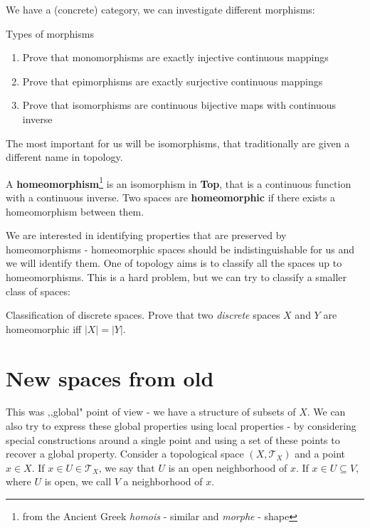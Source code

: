 We have a (concrete) category, we can investigate different morphisms:

\begin{exercise}
  Types of morphisms
  \begin{enumerate}
    \item Prove that monomorphisms are exactly injective continuous mappings
    \item Prove that epimorphisms are exactly surjective continuous mappings
    \item Prove that isomorphisms are continuous bijective maps with continuous inverse
  \end{enumerate}
\end{exercise}

The most important for us will be isomorphisms, that traditionally are given a different name in topology.

\begin{definition}
  A \textbf{homeomorphism}\footnote{from the Ancient Greek \textit{homois} - similar and \textit{morphe} - shape} is an isomorphism in \textbf{Top}, that is a continuous function with a continuous inverse. Two spaces are \textbf{homeomorphic} if there exists a homeomorphism between them.
\end{definition}

We are interested in identifying properties that are preserved by homeomorphisms - homeomorphic spaces should be indistinguishable for us and we will identify them. One of topology aims is to classify all the spaces up to homeomorphisms. This is a hard problem, but we can try to classify a smaller class of spaces:

\begin{exercise}
  Classification of discrete spaces.
  Prove that two \textit{discrete} spaces $X$ and $Y$ are homeomorphic iff $|X|=|Y|.$
\end{exercise}

\section{New spaces from old}




This was ,,global" point of view - we have a structure of subsets of $X$. We can also try to express these global properties using local
properties - by considering special constructions around a single point and using a set of these points to recover a global property.
Consider a topological space $(X,\mathcal T_X)$ and a point $x\in X$.
If $x\in U\in \mathcal T_X$, we say that $U$ is an open neighborhood
of $x$. If $x\in U\subseteq V$, where $U$ is open, we call $V$ a
neighborhood of $x$.

